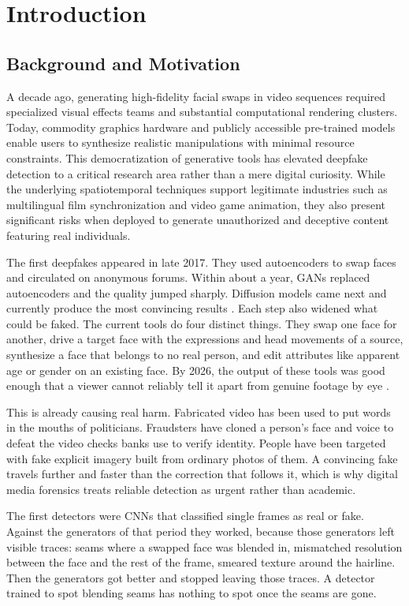 \section{Introduction}
\label{sec:introduction}

\subsection{Background and Motivation}
A decade ago, generating high-fidelity facial swaps in video sequences required specialized visual effects teams and substantial computational rendering clusters. Today, commodity graphics hardware and publicly accessible pre-trained models enable users to synthesize realistic manipulations with minimal resource constraints. This democratization of generative tools has elevated deepfake detection to a critical research area rather than a mere digital curiosity. While the underlying spatiotemporal techniques support legitimate industries such as multilingual film synchronization and video game animation, they also present significant risks when deployed to generate unauthorized and deceptive content featuring real individuals.

The first deepfakes appeared in late 2017. They used autoencoders to swap faces and circulated on anonymous forums. Within about a year, GANs replaced autoencoders and the quality jumped sharply. Diffusion models came next and currently produce the most convincing results \citep{Liu2025Evolving, Shiohara2025ExposeAnyone}. Each step also widened what could be faked. The current tools do four distinct things. They swap one face for another, drive a target face with the expressions and head movements of a source, synthesize a face that belongs to no real person, and edit attributes like apparent age or gender on an existing face. By 2026, the output of these tools was good enough that a viewer cannot reliably tell it apart from genuine footage by eye \citep{Liu2025SIDA}.

This is already causing real harm. Fabricated video has been used to put words in the mouths of politicians. Fraudsters have cloned a person's face and voice to defeat the video checks banks use to verify identity. People have been targeted with fake explicit imagery built from ordinary photos of them. A convincing fake travels further and faster than the correction that follows it, which is why digital media forensics treats reliable detection as urgent rather than academic.

The first detectors were CNNs that classified single frames as real or fake. Against the generators of that period they worked, because those generators left visible traces: seams where a swapped face was blended in, mismatched resolution between the face and the rest of the frame, smeared texture around the hairline. Then the generators got better and stopped leaving those traces. A detector trained to spot blending seams has nothing to spot once the seams are gone.


